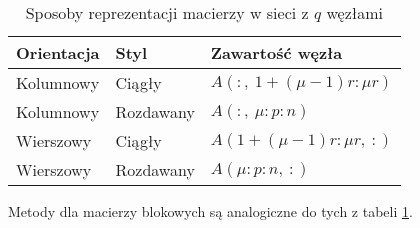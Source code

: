 \begin{table}[H]
\centering
\caption{Sposoby reprezentacji macierzy w sieci z \(q\) węzłami}
\begin{tabular}{ l | l | l }\label{tab:network_datatype}
  Orientacja & Styl & Zawartość węzła \\
  \hline
  Kolumnowy & Ciągły & \(A(\colon,\: 1+(\mu-1)r\colon \mu r)\) \\
  Kolumnowy & Rozdawany & \(A(\colon,\: \mu\colon p\colon n)\) \\
  Wierszowy & Ciągły & \(A(1+(\mu -1) r\colon\mu r,\: \colon)\) \\
  Wierszowy & Rozdawany & \(A(\mu \colon p\colon n,\: \colon)\) \\
 \end{tabular} 
 \end{table}

Metody dla macierzy blokowych są analogiczne do tych z tabeli \ref{tab:network_datatype}.